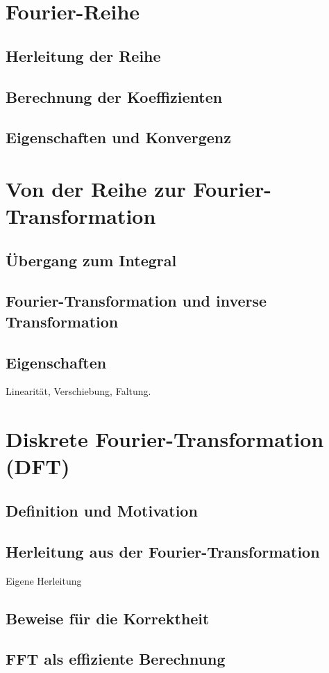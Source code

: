 \documentclass[a4paper,12pt]{article}
\begin{document}
\section{Fourier-Reihe}
\subsection{Herleitung der Reihe}
\subsection{Berechnung der Koeffizienten}
\subsection{Eigenschaften und Konvergenz}

\section{Von der Reihe zur Fourier-Transformation}
\subsection{Übergang zum Integral}
\subsection{Fourier-Transformation und inverse Transformation}
\subsection{Eigenschaften}
Linearität, Verschiebung, Faltung.

\section{Diskrete Fourier-Transformation (DFT)}
\subsection{Definition und Motivation}
\subsection{Herleitung aus der Fourier-Transformation}
Eigene Herleitung
\subsection{Beweise für die Korrektheit}
\subsection{FFT als effiziente Berechnung}
\end{document}
